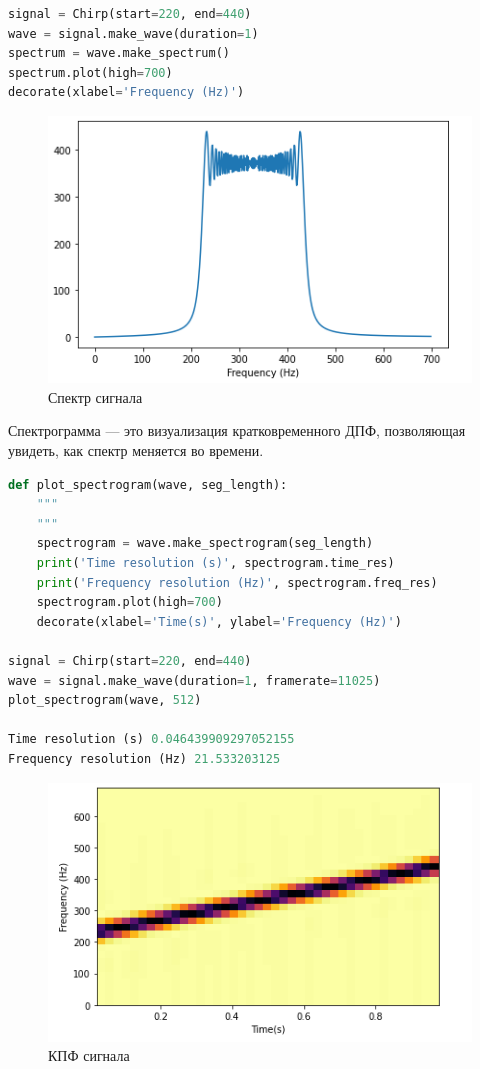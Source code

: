 \begin{lstlisting}[language=Python]
signal = Chirp(start=220, end=440)
wave = signal.make_wave(duration=1)
spectrum = wave.make_spectrum()
spectrum.plot(high=700)
decorate(xlabel='Frequency (Hz)')
\end{lstlisting}

\begin{figure}[H]
	\begin{center}
		\includegraphics[scale=1]{fig/lab03/lab03_06.png}
		\caption{Спектр сигнала}
	\end{center}
\end{figure}

Спектрограмма — это визуализация кратковременного ДПФ, позволяющая увидеть, как спектр меняется во времени.

\begin{lstlisting}[language=Python]
def plot_spectrogram(wave, seg_length):
    """
    """
    spectrogram = wave.make_spectrogram(seg_length)
    print('Time resolution (s)', spectrogram.time_res)
    print('Frequency resolution (Hz)', spectrogram.freq_res)
    spectrogram.plot(high=700)
    decorate(xlabel='Time(s)', ylabel='Frequency (Hz)')
    
signal = Chirp(start=220, end=440)
wave = signal.make_wave(duration=1, framerate=11025)
plot_spectrogram(wave, 512)

Time resolution (s) 0.046439909297052155
Frequency resolution (Hz) 21.533203125
\end{lstlisting}

\begin{figure}[H]
	\begin{center}
		\includegraphics[scale=1]{fig/lab03/lab03_07.png}
		\caption{КПФ сигнала}
	\end{center}
\end{figure}

